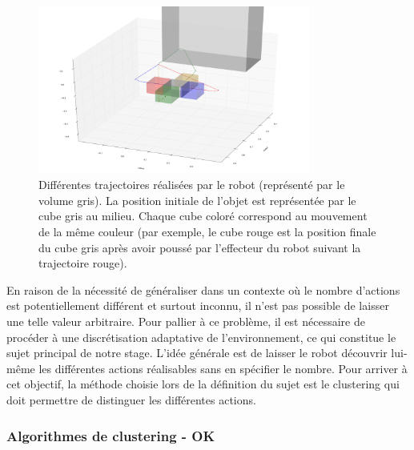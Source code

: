 \documentclass[draft]{llncs}
\begin{document}
\begin{figure}
  \begin{center}
    \includegraphics[width=0.8\textwidth]{figures/trajectories}
  \end{center}
  \caption{Différentes trajectoires réalisées par le robot (représenté par le volume gris). La position initiale de l'objet est représentée par le cube gris au milieu. Chaque cube coloré correspond au mouvement de la même couleur (par exemple, le cube rouge est la position finale du cube gris après avoir poussé par l'effecteur du robot suivant la trajectoire rouge).}
  \label{fig:trajectories}
\end{figure}

En raison de la nécessité de généraliser dans un contexte où le nombre d'actions est potentiellement différent et surtout inconnu, il n'est pas possible de laisser une telle valeur arbitraire.
Pour pallier à ce problème, il est nécessaire de procéder à une discrétisation adaptative de l'environnement, ce qui constitue le sujet principal de notre stage.
L'idée générale est de laisser le robot découvrir lui-même les différentes actions réalisables sans en spécifier le nombre.
Pour arriver à cet objectif, la méthode choisie lors de la définition du sujet est le clustering qui doit permettre de distinguer les différentes actions.




\subsubsection{Algorithmes de clustering - OK}
\end{document}
